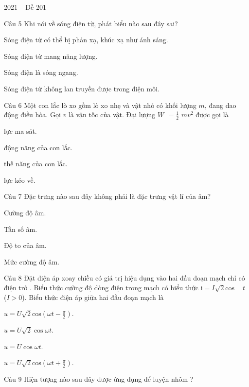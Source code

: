 \documentclass{book}
\begin{document}
\begin{quiz}{2021 – Đề 201}
\begin{multi}[points=1]{Câu 5}
 Khi nói về sóng điện từ, phát biểu nào sau đây sai? 

\item  Sóng điện từ có thể bị phản xạ, khúc xạ như ánh sáng.		
\item  Sóng điện từ mang năng lượng.	
\item*  Sóng điện là sóng ngang.		
\item  Sóng điện từ không lan truyền được trong điện môi.
\end{multi}

\begin{multi}[points=1]{Câu 6}
 Một con lắc lò xo gồm lò xo nhẹ và vật nhỏ có khối lượng $m$, đang dao động điều hòa. Gọi $v$ là vận tốc của vật. Đại lượng ${{W}_{}}$ $=\frac{1}{2}$ $m{{v}^{2}}$ được gọi là

\item  lực ma sát.	
\item  động năng của con lắc.	
\item  thế năng của con lắc.	
\item*  lực kéo về.
\end{multi}

\begin{multi}[points=1]{Câu 7}
 Đặc trưng nào sau đây không phải là đặc trưng vật lí của âm? 

\item  Cường độ âm.	
\item*  Tần số âm.	
\item  Độ to của âm.	
\item  Mức cường độ âm.
\end{multi}

\begin{multi}[points=1]{Câu 8}
 Đặt điện áp xoay chiều có giá trị hiệu dụng  vào hai đầu đoạn mạch chỉ có điện trở . Biểu thức cường độ dòng điện trong mạch có biểu thức $\text{i}=I\sqrt{2}\text{cos }\!\!~\!\!\text{ }t$ ($I>0$). Biểu thức điện áp giữa hai đầu đoạn mạch là 

\item  $u=U\sqrt{2}\text{cos}\left( \omega t-\frac{\pi }{2} \right)$.	
\item*  $u=U\sqrt{2}\cos \omega t$.	
\item  $u=U\cos \omega t$.		
\item  $u=U\sqrt{2}\text{cos}\left( \omega t+\frac{\pi }{2} \right)$.
\end{multi}

\begin{multi}[points=1]{Câu 9}
 Hiện tượng nào sau đây được ứng dụng để luyện nhôm ? 


\end{multi}
\end{quiz}
\end{document}
